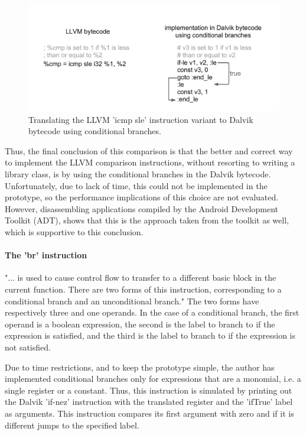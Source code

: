\documentclass[parskip]{cs4rep}
\begin{document}
\begin{figure}[h!]
    \centering
        \includegraphics[width=1.0\textwidth]{cmpsle2}
    \caption{Translating the LLVM 'icmp sle' instruction variant to Dalvik bytecode using conditional branches.}
    \label{fig:cmpsle2}
\end{figure}

Thus, the final conclusion of this comparison is that the better and correct way to implement the LLVM comparison instructions, without resorting to writing a library class, is by using the conditional branches in the Dalvik bytecode. Unfortunately, due to lack of time, this could not be implemented in the prototype, so the performance implications of this choice are not evaluated. However, disassembling applications compiled by the Android Development Toolkit (ADT), shows that this is the approach taken from the toolkit as well, which is supportive to this conclusion.

\paragraph{The 'br' instruction} "... is used to cause control flow to transfer to a different basic block in the current function. There are two forms of this instruction, corresponding to a conditional branch and an unconditional branch."\cite{P11} The two forms have respectively three and one operands. In the case of a conditional branch, the first operand is a boolean expression, the second is the label to branch to if the expression is satisfied, and the third is the label to branch to if the expression is not satisfied.

Due to time restrictions, and to keep the prototype simple, the author has implemented conditional branches only for expressions that are a monomial, i.e. a single register or a constant. Thus, this instruction is simulated by printing out the Dalvik 'if-nez' instruction with the translated register and the 'ifTrue' label as arguments. This instruction compares its first argument with zero and if it is different jumps to the specified label.
\end{document}
